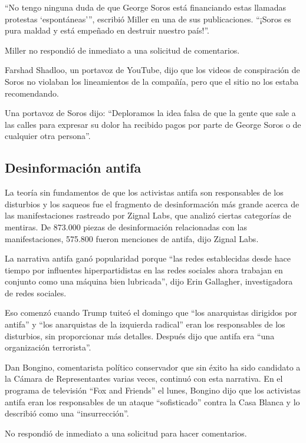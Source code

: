 ``No tengo ninguna duda de que George Soros está financiando estas
llamadas protestas `espontáneas''', escribió Miller en una de sus
publicaciones. ``¡Soros es pura maldad y está empeñado en destruir
nuestro país!''.

Miller no respondió de inmediato a una solicitud de comentarios.

Farshad Shadloo, un portavoz de YouTube, dijo que los videos de
conspiración de Soros no violaban los lineamientos de la compañía, pero
que el sitio no los estaba recomendando.

Una portavoz de Soros dijo: ``Deploramos la idea falsa de que la gente
que sale a las calles para expresar su dolor ha recibido pagos por parte
de George Soros o de cualquier otra persona''.

\hypertarget{desinformaciuxf3n-antifa}{%
\subsection{Desinformación antifa}\label{desinformaciuxf3n-antifa}}

La teoría sin fundamentos de que los activistas antifa son responsables
de los disturbios y los saqueos fue el fragmento de desinformación más
grande acerca de las manifestaciones rastreado por Zignal Labs, que
analizó ciertas categorías de mentiras. De 873.000 piezas de
desinformación relacionadas con las manifestaciones, 575.800 fueron
menciones de antifa, dijo Zignal Labs.

La narrativa antifa ganó popularidad porque ``las redes establecidas
desde hace tiempo por influentes hiperpartidistas en las redes sociales
ahora trabajan en conjunto como una máquina bien lubricada'', dijo Erin
Gallagher, investigadora de redes sociales.

Eso comenzó cuando Trump tuiteó el domingo que ``los anarquistas
dirigidos por antifa'' y ``los anarquistas de la izquierda radical''
eran los responsables de los disturbios, sin proporcionar más detalles.
Después dijo que antifa era ``una organización terrorista''.

Dan Bongino, comentarista político conservador que sin éxito ha sido
candidato a la Cámara de Representantes varias veces, continuó con esta
narrativa. En el programa de televisión ``Fox and Friends'' el lunes,
Bongino dijo que los activistas antifa eran los responsables de un
ataque ``sofisticado'' contra la Casa Blanca y lo describió como una
``insurrección''.

No respondió de inmediato a una solicitud para hacer comentarios.

